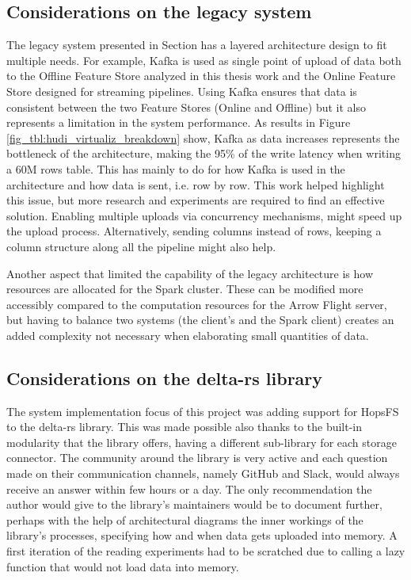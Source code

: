 \subsection{Considerations on the legacy system}

The legacy system presented in Section  has a layered architecture design to fit multiple needs. For example, Kafka is used as single point of upload of data both to the Offline Feature Store analyzed in this thesis work and the Online Feature Store designed for streaming pipelines. Using Kafka ensures that data is consistent between the two Feature Stores (Online and Offline) but it also represents a limitation in the system performance. As results in Figure \ref{fig_tbl:hudi_virtualiz_breakdown} show, Kafka as data increases represents the bottleneck of the architecture, making the 95\% of the write latency when writing a 60M rows table. This has mainly to do for how Kafka is used in the architecture and how data is sent, i.e. row by row. 
This work helped highlight this issue, but more research and experiments are required to find an effective solution. Enabling multiple uploads via concurrency mechanisms, might speed up the upload process. Alternatively, sending columns instead of rows, keeping a column structure along all the pipeline might also help. 

Another aspect that limited the capability of the legacy architecture is how resources are allocated for the Spark cluster. These can be modified more accessibly compared to the computation resources for the Arrow Flight server, but having to balance two systems (the client's and the Spark client) creates an added complexity not necessary when elaborating small quantities of data.

\subsection{Considerations on the delta-rs library}

The system implementation focus of this project was adding support for \gls{HopsFS} to the delta-rs library. This was made possible also thanks to the built-in modularity that the library offers, having a different sub-library for each storage connector. The community around the library is very active and each question made on their communication channels, namely GitHub and Slack, would always receive an answer within few hours or a day. The only recommendation the author would give to the library's maintainers would be to document further, perhaps with the help of architectural diagrams the inner workings of the library's processes, specifying how and when data gets uploaded into memory. A first iteration of the reading experiments had to be scratched due to calling a lazy function that would not load data into memory. 

